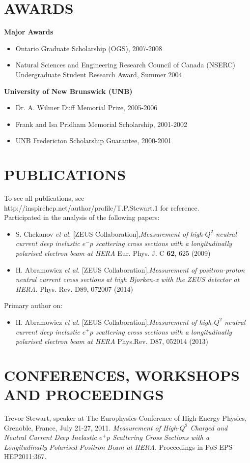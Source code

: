 \documentclass[margin]{res}
\begin{document}
\begin{resume}
\section{AWARDS}
\textbf{Major Awards}\\
\begin{itemize}
\item Ontario Graduate Scholarship (OGS), 2007-2008
\item Natural Sciences and Engineering Research Council of Canada (NSERC) Undergraduate Student Research Award, Summer 2004
\end{itemize}
\textbf{University of New Brunswick (UNB)}\\
\begin{itemize}
\item Dr. A. Wilmer Duff Memorial Prize, 2005-2006
\item Frank and  Isa  Pridham Memorial Scholarship, 2001-2002
\item UNB Fredericton Scholarship Guarantee, 2000-2001
\end{itemize}

\section{PUBLICATIONS}
To see all publications, see \\http://inspirehep.net/author/profile/T.P.Stewart.1 
for reference.\\
Participated in the analysis of the following papers:
\begin{itemize}
\item  S. Chekanov {\it et al.}  [ZEUS Collaboration],\textit{Measurement of high-$Q^2$ neutral current deep inelastic $e^- p$ scattering cross sections with a longitudinally polarised electron beam at HERA} Eur. Phys. J. C {\bf 62}, 625 (2009)
\item H. Abramowicz {\it et al.} [ZEUS Collaboration],\textit{Measurement of positron-proton neutral current cross sections at high Bjorken-x with the ZEUS detector at HERA.} Phys. Rev. D89, 072007 (2014)
\end{itemize}
Primary author on:
\begin{itemize}
\item H. Abramowicz {\it et al.} [ZEUS Collaboration],\textit{Measurement of high-$Q^2$ neutral current deep inelastic $e^+ p$ scattering cross sections with a longitudinally polarised electron beam at HERA} Phys.Rev. D87, 052014 (2013)
\end{itemize}
\section{CONFERENCES, WORKSHOPS AND PROCEEDINGS}
Trevor Stewart, speaker at The Europhysics Conference of High-Energy Physics, Grenoble, France, July 21-27, 2011. \textit{Measurement of High-$Q^2$ Charged and Neutral Current Deep Inelastic $e^{+}p$ Scattering Cross Sections with a Longitudinally Polarised Positron Beam at HERA.} Proceedings in PoS EPS-HEP2011:367.


\end{resume}
\end{document}
